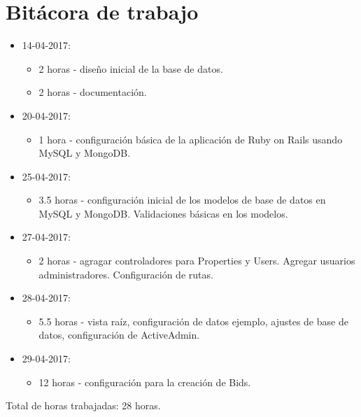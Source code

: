 \documentclass{article}
\begin{document}
\section{Bit\'acora de trabajo}
\begin{itemize}
  \item 14-04-2017:
  \begin{itemize}
    \item 2 horas - dise\~no inicial de la base de datos.
    \item 2 horas - documentaci\'on.
  \end{itemize}
  \item 20-04-2017:
  \begin{itemize}
    \item 1 hora - configuraci\'on b\'asica de la aplicaci\'on de Ruby on Rails usando MySQL y MongoDB.
  \end{itemize}
  \item 25-04-2017:
  \begin{itemize}
    \item 3.5 horas - configuraci\'on inicial de los modelos de base de datos en MySQL y MongoDB. Validaciones b\'asicas en los modelos.
  \end{itemize}
  \item 27-04-2017:
  \begin{itemize}
    \item 2 horas - agragar controladores para Properties y Users. Agregar usuarios administradores. Configuraci\'on de rutas.
  \end{itemize}
  \item 28-04-2017:
  \begin{itemize}
    \item 5.5 horas - vista ra\'iz, configuraci\'on de datos ejemplo, ajustes de base de datos, configuraci\'on de ActiveAdmin.
  \end{itemize}
  \item 29-04-2017:
  \begin{itemize}
    \item 12 horas - configuraci\'on para la creaci\'on de Bids.
  \end{itemize}
\end{itemize}
Total de horas trabajadas: 28 horas.
\end{document}
